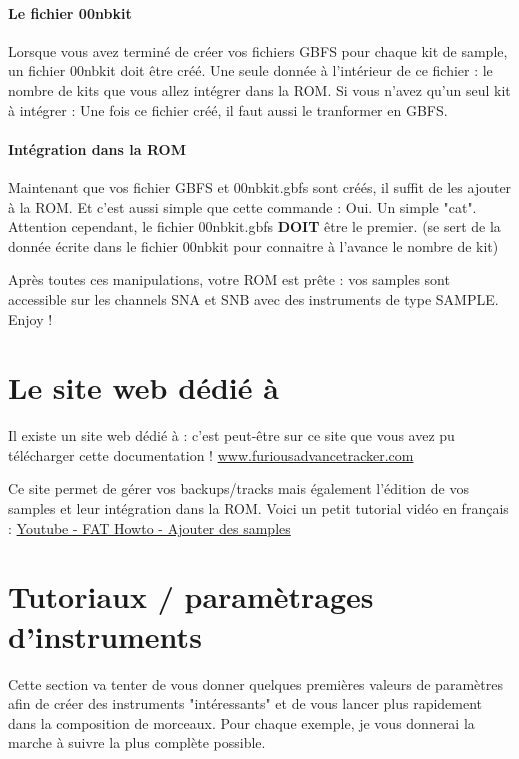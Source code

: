 \documentclass[12pt,a4paper]{article}
\begin{document}
  \paragraph{Le fichier 00nbkit} Lorsque vous avez terminé de créer vos fichiers GBFS pour chaque kit de sample, un fichier 00nbkit doit être créé. Une seule donnée à l'intérieur de ce fichier : le nombre de kits que vous allez intégrer dans la ROM. Si vous n'avez qu'un seul kit à intégrer :
  Une fois ce fichier créé, il faut aussi le tranformer en GBFS.

  \paragraph{Intégration dans la ROM} Maintenant que vos fichier GBFS et 00nbkit.gbfs sont créés, il suffit de les ajouter à la ROM. Et c'est aussi simple que cette commande :
  Oui. Un simple "cat". Attention cependant, le fichier 00nbkit.gbfs {\bf DOIT} être le premier. (\FAT se sert de la donnée écrite dans le fichier 00nbkit pour connaitre à l'avance le nombre de kit)\medskip

  Après toutes ces manipulations, votre ROM est prête : vos samples sont accessible sur les channels SNA et SNB avec des instruments de type SAMPLE. Enjoy !

  \section{Le site web dédié à \FAT}

  Il existe un site web dédié à \FAT : c'est peut-être sur ce site que vous avez pu télécharger cette documentation ! \href{http://www.furiousadvancetracker.com}{www.furiousadvancetracker.com}\medskip

  Ce site permet de gérer vos backups/tracks mais également l'édition de vos samples et leur intégration dans la ROM. Voici un petit tutorial vidéo en français : \href{https://www.youtube.com/watch?v=a9rPzz-6Mgg}{Youtube - FAT Howto - Ajouter des samples}

  \section{Tutoriaux / paramètrages d'instruments}
  
  Cette section va tenter de vous donner quelques premières valeurs de paramètres afin de créer des instruments "intéressants" et de vous lancer plus rapidement dans la composition de morceaux. Pour chaque exemple, je vous donnerai la marche à suivre la plus complète possible.
  
\end{document}
